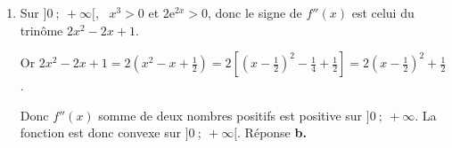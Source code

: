 \documentclass[10pt]{article}
\providecommand{\e}{{\mathrm{e}}}
\begin{document}
\begin{enumerate}
\item  Sur $]0~;~+\infty[$, \, $x^3 > 0$ et $2\e^{2x} > 0$, donc le signe de $f''(x)$ est celui du trinôme $2x^2 - 2x +  1$.

Or $2x^2 - 2x +  1 = 2\left(x^2 - x + \frac{1}{2}\right) = 2\left[ \left (x - \frac{1}{2}\right)^2 - \frac{1}{4} + \frac{1}{2}\right ] = 2\left(x - \frac{1}{2}\right)^2 + \frac{1}{2}$. 

Donc $f''(x)$ somme de deux nombres positifs est positive sur $]0~;~+ \infty$. La fonction est donc convexe sur $]0~;~+\infty[$. \hfill{}Réponse \textbf{b.}








 
\end{enumerate}

\vspace{0,5cm}
\end{document}

